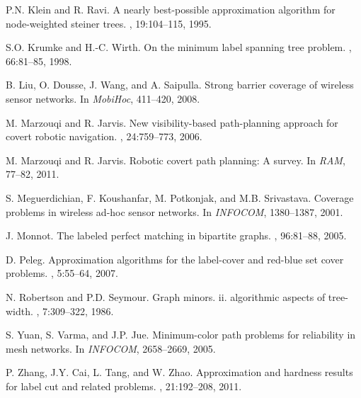 \documentclass[12pt]{article}
\begin{document}
{\begin{thebibliography}{10}
P.N. Klein and R. Ravi.
\newblock A nearly best-possible approximation algorithm for node-weighted
  steiner trees.
, 19:104--115, 1995.

S.O. Krumke and H.-C. Wirth.
\newblock On the minimum label spanning tree problem.
, 66:81--85, 1998.

B. Liu, O. Dousse, J. Wang, and A. Saipulla.
\newblock Strong barrier coverage of wireless sensor networks.
\newblock In {\em MobiHoc}, 411--420, 2008.

M. Marzouqi and R. Jarvis.
\newblock New visibility-based path-planning approach for covert robotic
  navigation.
, 24:759--773, 2006.

M. Marzouqi and R. Jarvis.
\newblock Robotic covert path planning: A survey.
\newblock In {\em RAM}, 77--82, 2011.

S. Meguerdichian, F. Koushanfar, M. Potkonjak, and M.B. Srivastava.
\newblock Coverage problems in wireless ad-hoc sensor networks.
\newblock In {\em INFOCOM}, 1380--1387, 2001.

J. Monnot.
\newblock The labeled perfect matching in bipartite graphs.
, 96:81--88, 2005.

D. Peleg.
\newblock Approximation algorithms for the label-cover and
  red-blue set cover problems.
, 5:55--64, 2007.

N. Robertson and P.D. Seymour.
\newblock Graph minors. ii. algorithmic aspects of tree-width.
, 7:309--322, 1986.

S. Yuan, S. Varma, and J.P. Jue.
\newblock Minimum-color path problems for reliability in mesh networks.
\newblock In {\em INFOCOM}, 2658--2669, 2005.

P. Zhang, J.Y. Cai, L. Tang, and W. Zhao.
\newblock Approximation and hardness results for label cut and related
  problems.
, 21:192--208, 2011.

\end{thebibliography}

}
\end{document}
